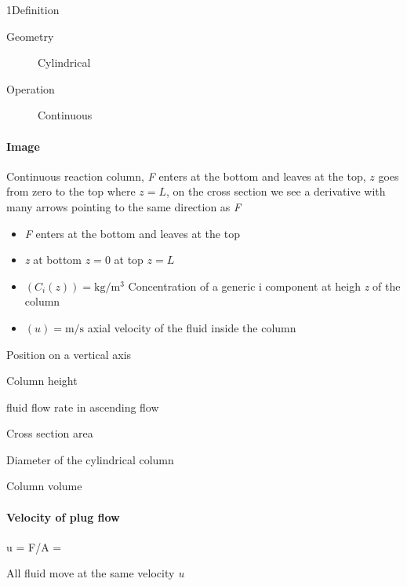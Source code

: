 \documentclass[\mainfilename]{subfiles}
\begin{document}
\begin{sectionBox}1{Definition} %
    
    \begin{description}
        \item[Geometry] Cylindrical
        \item[Operation] Continuous
    \end{description}

    \paragraph*{Image}
    Continuous reaction column, \textit{F} enters at the bottom and leaves at the top, \(z\) goes from zero to the top where \(z=L\), on the cross section we see a derivative with many arrows pointing to the same direction as \textit{F}
    \begin{itemize}
        \item \textit{F} enters at the bottom and leaves at the top
        \item \textit{z} at bottom \(z=0\) at top \(z=L\)
        \item \((C_i(z))=\si{\kilo\gram/\metre^3}\) Concentration of a generic i component at heigh \textit{z} of the column
        \item \((u)=\si{\metre/\second}\) axial velocity of the fluid inside the column
    \end{itemize}

    \begin{description}[
        leftmargin=!,
        labelwidth=\widthof{\((F)=\si{\metre^3/\hour}\)} %
    ]
        \item[\((z)=\si{\metre}\)] 
        Position on a vertical axis 
        \item[\((L)=\si{\metre}\)]
        Column height
        \item[\((F)=\si{\metre^3/\hour}\)] 
        fluid flow rate in ascending flow
        \item[\((A)=\si{\metre^2}\)] 
        Cross section area
        \item[\((d)=\si{\metre}\)] 
        Diameter of the cylindrical column
        \item[\(V=A\,L\)] Column volume
    \end{description}

    \paragraph*{Velocity of plug flow}
    \begin{BM}
        u = F/A = 
    \end{BM}
    All fluid move at the same velocity \textit{u}


\end{sectionBox}
\end{document}
